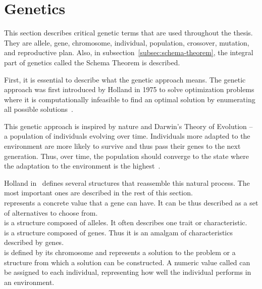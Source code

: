 \section{Genetics}\label{sec:genetics}

This section describes critical genetic terms that are used throughout the thesis.
They are allele, gene, chromosome, individual, population, crossover, mutation, and reproductive plan.
Also, in subsection~\ref{subsec:schema-theorem}, the integral part of genetics called the Schema Theorem is described.

First, it is essential to describe what the genetic approach means.
The genetic approach was first introduced by Holland in 1975
to solve optimization problems where it is computationally infeasible to
find an optimal solution by enumerating all possible solutions~\cite{hollandAdaptationNaturalArtificial1975}.

This genetic approach is inspired by nature and Darwin’s Theory of Evolution
– a population of individuals evolving over time.
Individuals more adapted to the environment are
more likely to survive and thus pass their genes to the next generation.
Thus, over time, the population should converge to the state where the adaptation to the environment is the highest~\cite{darwinOriginSpeciesMeans2009}.

Holland in~\cite{hollandAdaptationNaturalArtificial1975} defines several structures that reassemble this natural process.
The most important ones are described in the rest of this section.\\

 represents a concrete value that a gene can have.
It can be thus described as a set of alternatives to choose from. \\

 is a structure composed of alleles.
It often describes one trait or characteristic. \\

 is a structure composed of genes.
Thus it is an amalgam of characteristics described by genes.\\

 is defined by its chromosome and represents a solution to the problem or a structure from which a solution can be constructed.
A numeric value called  can be assigned to each individual, representing how well the individual performs in an environment. \\


